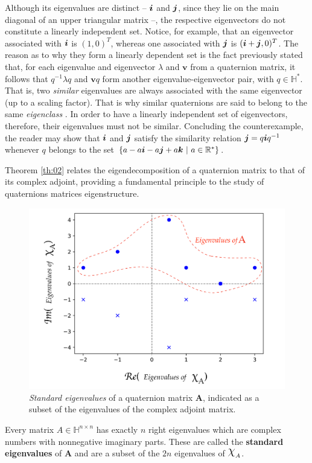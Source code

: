 Although its eigenvalues are distinct -- $ \boldsymbol{i} $ and $ \boldsymbol{j} $, since they lie on the main diagonal of an upper triangular matrix --, the respective eigenvectors do not constitute a linearly independent set. Notice, for example, that an eigenvector associated with $ \boldsymbol{i} $ is $ (1, 0)^T $, whereas one associated with $ \boldsymbol{j} $ is $ (\boldsymbol{i} + \boldsymbol{j}, 0)^T $. The reason as to why they form a linearly dependent set is the fact previously stated that, for each eigenvalue and eigenvector $ \lambda $ and $ \mathbf{v} $ from a quaternion matrix, it follows that $ q^{-1}\lambda q $ and $ \mathbf{v}q $ form another eigenvalue-eigenvector pair, with $ q \in \mathbb{H}^\ast $. That is, two \emph{similar} eigenvalues are always associated with the same eigenvector (up to a scaling factor). That is why similar quaternions are said to belong to the same \emph{eigenclass} \cite{de2000right}. In order to have a linearly independent set of eigenvectors, therefore, their eigenvalues must not be similar. Concluding the counterexample, the reader may show that $ \boldsymbol{i} $ and $ \boldsymbol{j} $ satisfy the similarity relation $ \boldsymbol{j} = q \boldsymbol{i} q^{-1} $ whenever $q$ belongs to the set $ \{ a - a\boldsymbol{i} - a\boldsymbol{j} + a\boldsymbol{k} \ | \ a\in \mathbb{R}^\ast \} $.

Theorem \ref{th:02} relates the eigendecomposition of a quaternion matrix to that of its complex adjoint, providing a fundamental principle to the study of quaternions matrices eigenstructure.

\begin{figure}
    \centering
    \includegraphics[width=0.7\linewidth]{Figures/complex_adjoint_eigvals_EN.pdf}
    \caption{\emph{Standard eigenvalues} of a quaternion matrix $ \mathbf{A} $, indicated as a subset of the eigenvalues of the complex adjoint matrix.}
\end{figure}


\begin{theorem}
    \label{th:02}
    Every matrix $ A \in \mathbb{H}^{n \times n} $ has exactly $ n $ right eigenvalues which are complex numbers with nonnegative imaginary parts. These are called the \textbf{standard eigenvalues} of $ \mathbf{A} $ and are a subset of the $ 2n $ eigenvalues of $ \rchi_A $.
\end{theorem}

